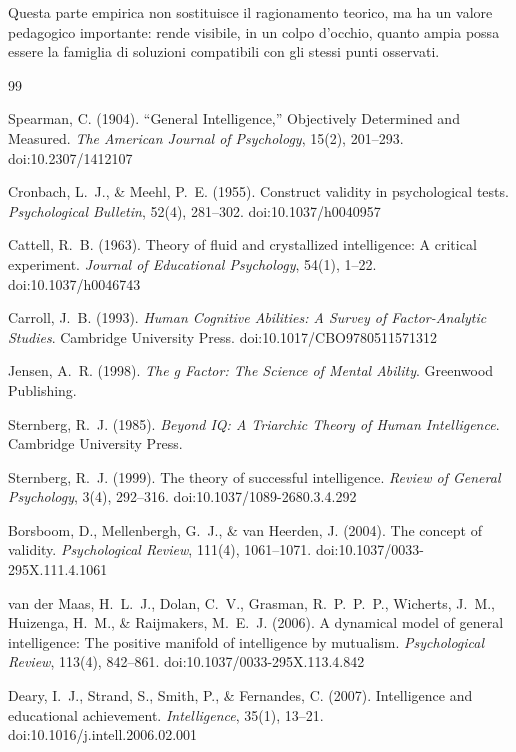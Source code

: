 \documentclass[10pt, a4paper]{article}
\theoremstyle{plain}
\theoremstyle{definition}
\theoremstyle{remark}
\begin{document}
Questa parte empirica non sostituisce il ragionamento teorico, ma ha un valore
pedagogico importante: rende visibile, in un colpo d'occhio, quanto ampia possa
essere la famiglia di soluzioni compatibili con gli stessi punti osservati.

\begin{thebibliography}{99}

Spearman, C. (1904).
``General Intelligence,'' Objectively Determined and Measured.
\textit{The American Journal of Psychology}, 15(2), 201--293.
doi:10.2307/1412107

Cronbach, L.~J., \& Meehl, P.~E. (1955).
Construct validity in psychological tests.
\textit{Psychological Bulletin}, 52(4), 281--302.
doi:10.1037/h0040957

Cattell, R.~B. (1963).
Theory of fluid and crystallized intelligence: A critical experiment.
\textit{Journal of Educational Psychology}, 54(1), 1--22.
doi:10.1037/h0046743

Carroll, J.~B. (1993).
\textit{Human Cognitive Abilities: A Survey of Factor-Analytic Studies}.
Cambridge University Press.
doi:10.1017/CBO9780511571312

Jensen, A.~R. (1998).
\textit{The g Factor: The Science of Mental Ability}.
Greenwood Publishing.

Sternberg, R.~J. (1985).
\textit{Beyond IQ: A Triarchic Theory of Human Intelligence}.
Cambridge University Press.

Sternberg, R.~J. (1999).
The theory of successful intelligence.
\textit{Review of General Psychology}, 3(4), 292--316.
doi:10.1037/1089-2680.3.4.292

Borsboom, D., Mellenbergh, G.~J., \& van Heerden, J. (2004).
The concept of validity.
\textit{Psychological Review}, 111(4), 1061--1071.
doi:10.1037/0033-295X.111.4.1061

van der Maas, H.~L.~J., Dolan, C.~V., Grasman, R.~P.~P.~P., Wicherts, J.~M.,
Huizenga, H.~M., \& Raijmakers, M.~E.~J. (2006).
A dynamical model of general intelligence: The positive manifold of intelligence
by mutualism.
\textit{Psychological Review}, 113(4), 842--861.
doi:10.1037/0033-295X.113.4.842

Deary, I.~J., Strand, S., Smith, P., \& Fernandes, C. (2007).
Intelligence and educational achievement.
\textit{Intelligence}, 35(1), 13--21.
doi:10.1016/j.intell.2006.02.001


\end{thebibliography}
\end{document}
